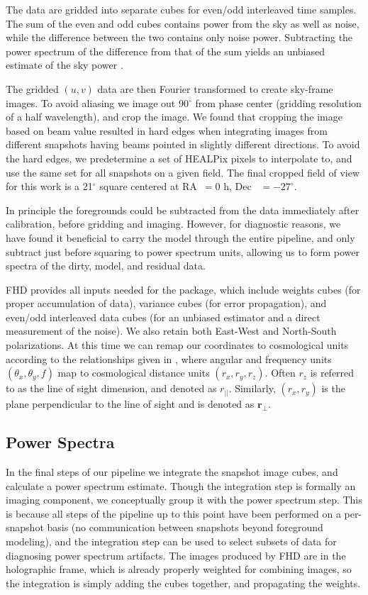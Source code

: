 \documentclass[iop]{emulateapj}
\begin{document}
The data are gridded into separate cubes for even/odd interleaved time samples. 
The sum of the even and odd cubes contains power from the sky as well as noise,
while the difference between the two contains only noise power. Subtracting the power
spectrum of the difference from that of the sum yields an unbiased estimate of the sky power
\citep{Jacobs:2016}.

The gridded $(u,v)$ data are then Fourier transformed to create sky-frame images. To avoid 
aliasing we image out 90$^\circ$ from phase center (gridding resolution of a half 
wavelength), and crop the image. We found that cropping the image based on beam value 
resulted in hard edges when integrating images from different snapshots having beams pointed 
in slightly different directions. To avoid the hard edges, we predetermine a set of HEALPix 
pixels to interpolate to, and use the same set for all snapshots on a given field. The final 
cropped field of view for this work is a 21$^\circ$ square centered at RA~$=0$ h, Dec~
$=-27^\circ$. 

In principle the foregrounds could be subtracted from the data immediately after calibration, 
before gridding and imaging. However, for diagnostic reasons, we have found it beneficial to 
carry the model through the entire pipeline, and only subtract just before squaring to power 
spectrum units, allowing us to form power spectra of the dirty, model, and residual data.

FHD provides all inputs needed for the \eppsilon package, which include weights cubes (for 
proper accumulation of data), variance cubes (for error propagation), and even/odd 
interleaved data cubes (for an unbiased estimator and a direct measurement of the noise). 
We also retain both East-West and North-South polarizations. At this time we can remap 
our coordinates to cosmological units according to the relationships given in 
\citealt{Morales:2004}, where angular and frequency units $(\theta_x,\theta_y,f)$ map to 
cosmological distance units $(r_x,r_y,r_z)$. Often $r_z$ is referred to as the line of sight 
dimension, and denoted as $r_{||}$. Similarly, $(r_x,r_y)$ is the plane perpendicular to the 
line of sight and is denoted as $\mathbf{r_{\perp}}$.

\subsection{Power Spectra}
In the final steps of our pipeline we integrate the snapshot image cubes, and calculate a 
power spectrum estimate. Though the integration step is formally an imaging component, 
we conceptually group it with the power spectrum step. This is because all steps of the 
pipeline up to this point have been performed on a per-snapshot basis (no communication 
between snapshots beyond foreground modeling), and the integration step can be used to 
select subsets of data for diagnosing power spectrum artifacts. The images produced by 
FHD are in the holographic frame, which is already properly weighted for combining 
images, so the integration is simply adding the cubes together, and propagating the 
weights.
\end{document}
